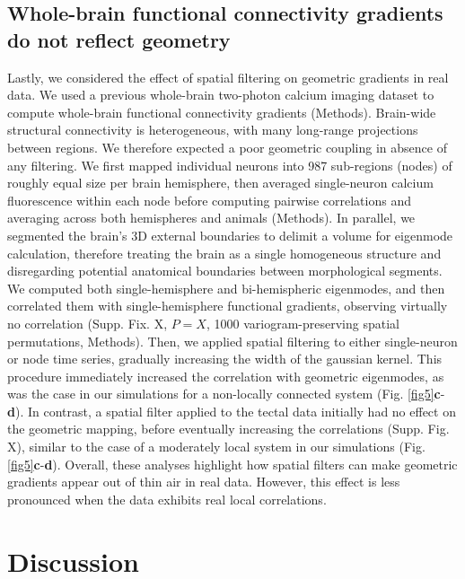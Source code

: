 \documentclass{article}
\begin{document}
\subsection*{Whole-brain functional connectivity gradients do not reflect geometry}

Lastly, we considered the effect of spatial filtering on geometric gradients in real data. We used a previous whole-brain two-photon calcium imaging dataset to compute whole-brain functional connectivity gradients (Methods). Brain-wide structural connectivity is heterogeneous, with many long-range projections between regions. We therefore expected a poor geometric coupling in absence of any filtering. We first mapped individual neurons into 987 sub-regions (nodes) of roughly equal size per brain hemisphere, then averaged single-neuron calcium fluorescence within each node before computing pairwise correlations and averaging across both hemispheres and animals (Methods). In parallel, we segmented the brain's 3D external boundaries to delimit a volume for eigenmode calculation, therefore treating the brain as a single homogeneous structure and disregarding potential anatomical boundaries between morphological segments. We computed both single-hemisphere and bi-hemispheric eigenmodes, and then correlated them with single-hemisphere functional gradients, observing virtually no correlation (Supp. Fix. X, $P=X$, 1000 variogram-preserving spatial permutations, Methods). Then, we applied spatial filtering to either single-neuron or node time series, gradually increasing the width of the gaussian kernel. This procedure immediately increased the correlation with geometric eigenmodes, as was the case in our simulations for a non-locally connected system (Fig. \ref{fig5}\textbf{c}-\textbf{d}). In contrast, a spatial filter applied to the tectal data initially had no effect on the geometric mapping, before eventually increasing the correlations (Supp. Fig. X), similar to the case of a moderately local system in our simulations (Fig. \ref{fig5}\textbf{c}-\textbf{d}). Overall, these analyses highlight how spatial filters can make geometric gradients appear out of thin air in real data. However, this effect is less pronounced when the data exhibits real local correlations.

\section*{Discussion}

\end{document}
